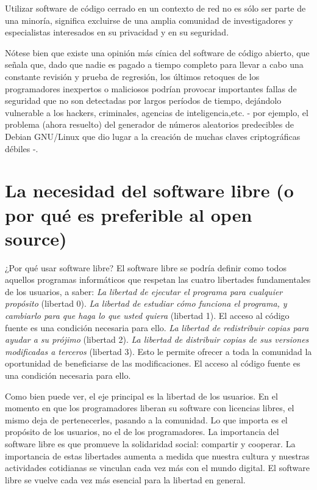 \documentclass[10pt,a5paper,twoside,,]{book}
\begin{document}
Utilizar software de código cerrado en un contexto de red no es sólo ser
parte de una minoría, significa excluirse de una amplia comunidad de
investigadores y especialistas interesados en su privacidad y en su
seguridad.

Nótese bien que existe una opinión más cínica del software de código
abierto, que señala que, dado que nadie es pagado a tiempo completo para
llevar a cabo una constante revisión y prueba de regresión, los últimos
retoques de los programadores inexpertos o maliciosos podrían provocar
importantes fallas de seguridad que no son detectadas por largos
períodos de tiempo, dejándolo vulnerable a los hackers, criminales,
agencias de inteligencia,etc. - por ejemplo, el problema (ahora
resuelto) del generador de números aleatorios predecibles de Debian
GNU/Linux que dio lugar a la creación de muchas claves criptográficas
débiles -.

\chapter{La necesidad del software libre (o por qué es preferible al
open
source)}\label{la-necesidad-del-software-libre-o-por-quuxe9-es-preferible-al-open-source}

¿Por qué usar software libre? El software libre se podría definir como
todos aquellos programas informáticos que respetan las cuatro libertades
fundamentales de los usuarios, a saber: \emph{La libertad de ejecutar el
programa para cualquier propósito} (libertad 0). \emph{La libertad de
estudiar cómo funciona el programa, y cambiarlo para que haga lo que
usted quiera} (libertad 1). El acceso al código fuente es una condición
necesaria para ello. \emph{La libertad de redistribuir copias para
ayudar a su prójimo} (libertad 2). \emph{La libertad de distribuir
copias de sus versiones modificadas a terceros} (libertad 3). Esto le
permite ofrecer a toda la comunidad la oportunidad de beneficiarse de
las modificaciones. El acceso al código fuente es una condición
necesaria para ello.

Como bien puede ver, el eje principal es la libertad de los usuarios. En
el momento en que los programadores liberan su software con licencias
libres, el mismo deja de pertenecerles, pasando a la comunidad. Lo que
importa es el propósito de los usuarios, no el de los programadores. La
importancia del software libre es que promueve la solidaridad social:
compartir y cooperar. La importancia de estas libertades aumenta a
medida que nuestra cultura y nuestras actividades cotidianas se vinculan
cada vez más con el mundo digital. El software libre se vuelve cada vez
más esencial para la libertad en general.
\end{document}
